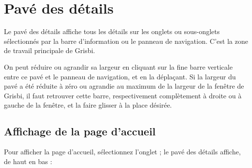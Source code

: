 \ifIllustration
\else
\newpage
\fi


\section{Pavé des détails\label{home-details}}


Le pavé des détails affiche tous les détails sur les onglets ou sous-onglets sélectionnés par la barre d'information ou le panneau de navigation. C'est la zone de travail principale de Grisbi.

On peut réduire ou agrandir sa largeur en cliquant sur la fine barre verticale entre ce pavé et le panneau de navigation, et en la déplaçant. Si la largeur du pavé a été réduite à zéro ou agrandie au maximum de la largeur de la fenêtre de Grisbi, il faut retrouver cette barre, respectivement complètement à droite ou à gauche de la fenêtre, et la faire glisser à la place désirée. 
 
 
\subsection{Affichage de la page d'accueil\label{home-details-homepage}}

Pour afficher la page d'accueil, sélectionnez l'onglet  ; le pavé des détails affiche, de haut en bas :

